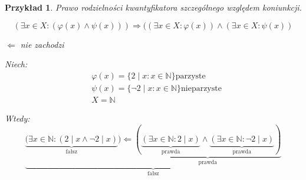 \documentclass[a5paper,8pt]{article}
\newtheorem*{example}{Przykład}
\begin{document}
            \begin{example}
                Prawo rodzielności kwantyfikatora szczególnego względem koniunkcji.

                \begin{equation*}
                    (\exists x \in X : ( \varphi(x) \wedge \psi(x))) \Rightarrow ((\exists x \in X : \varphi(x)) \wedge (\exists x \in X : \psi(x))
                \end{equation*}

                \begin{center}
                    $ \Leftarrow $ nie zachodzi
                \end{center}

                Niech:
                \begin{equation*}
                    \begin{aligned}
                        & \varphi(x) = \{ 2 \mid x : x \in \mathbb{N} \} \text{parzyste}\\
                        & \psi(x) = \{ \neg 2 \mid x : x \in \mathbb{N} \} \text{nieparzyste} \\
                        & X = \mathbb{N}
                    \end{aligned}
                \end{equation*}

                Wtedy:
                \begin{equation*}
                    \underbrace{\underbrace{(\exists x \in \mathbb{N} : (2\mid x \wedge \neg 2\mid x )}_{\text{fałsz}})
                    \Leftarrow \underbrace{(\underbrace{(\exists x \in \mathbb{N} : 2 \mid x)}_{\text{prawda}} \wedge \underbrace{(\exists x \in \mathbb{N} : \neg 2 \mid x)}_{\text{prawda}})}_{\text{prawda}}}_{\text{fałsz}}
                \end{equation*}

            \end{example}
\end{document}
